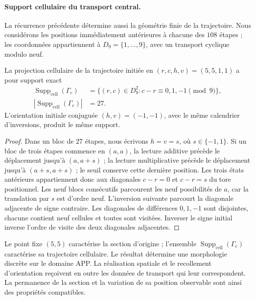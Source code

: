 \paragraph{Support cellulaire du transport central.}
La récurrence précédente détermine aussi la géométrie finie de la
trajectoire. Nous considérons les positions immédiatement antérieures à chacune
des \(108\) étapes ; les coordonnées appartiennent à
\(D_9=\{1,\ldots,9\}\), avec un transport cyclique modulo neuf.

\begin{proposition}
\label{prop:el-soporte-27}
La projection cellulaire de la trajectoire initiée en \((r,c,h,v)=(5,5,1,1)\) a pour support exact
\begin{equation}
 \begin{aligned}
 \operatorname{Supp}_{\mathrm{cell}}(\Gamma_e)&=\{(r,c)\in D_9^2:
                 c-r\equiv0,1,-1\pmod9\},
 \\
 |\operatorname{Supp}_{\mathrm{cell}}(\Gamma_e)|&=27.
 \end{aligned}
 \label{eq:el-soporte-27}
\end{equation}
L'orientation initiale conjuguée \((h,v)=(-1,-1)\), avec le même calendrier d'inversions, produit le même support.
\end{proposition}
\begin{proof}
Dans un bloc de \(27\) étapes, nous écrivons \(h=v=s\), où
\(s\in\{-1,1\}\). Si un bloc de trois étapes commence en \((a,a)\),
la lecture additive précède le déplacement jusqu'à \((a,a+s)\) ;
la lecture multiplicative précède le déplacement jusqu'à
\((a+s,a+s)\) ; le seuil conserve cette dernière position. Les trois
états antérieurs appartiennent donc aux diagonales
\(c-r=0\) et \(c-r=s\) du tore positionnel. Les neuf blocs
consécutifs parcourent les neuf possibilités de \(a\), car la
translation par \(s\) est d'ordre neuf. L'inversion suivante
parcourt la diagonale adjacente de signe contraire. Les diagonales
de différences \(0,1,-1\) sont disjointes, chacune contient neuf
cellules et toutes sont visitées. Inverser le signe initial
inverse l'ordre de visite des deux diagonales adjacentes.
\end{proof}

Le point fixe \((5,5)\) caractérise la section d'origine ; l'ensemble \(\operatorname{Supp}_{\mathrm{cell}}(\Gamma_e)\) caractérise sa trajectoire cellulaire. Le résultat détermine une morphologie discrète sur le domaine APP. La réalisation spatiale et le recollement d'orientation reçoivent en outre les données de transport qui leur correspondent. La permanence de la section et la variation de sa position observable sont ainsi des propriétés compatibles.

